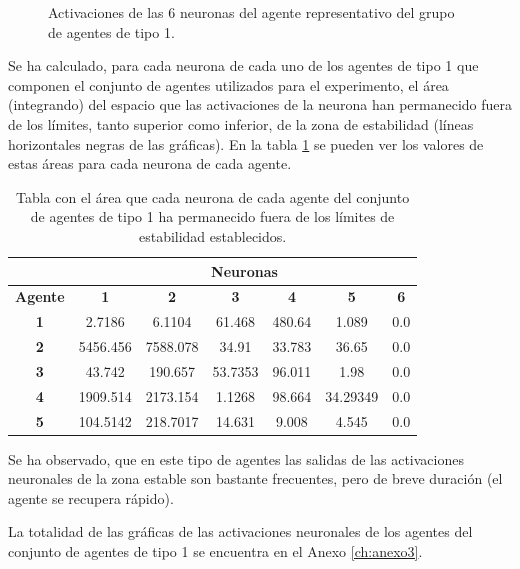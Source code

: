\begin{figure}[H]
  \caption{Activaciones de las 6 neuronas del agente representativo del grupo de agentes de tipo 1.}
  \label{fig:activ1}
\end{figure}

Se ha calculado, para cada neurona de cada uno de los agentes de tipo 1 que componen el conjunto de agentes utilizados para el experimento, el área (integrando) del espacio que las activaciones de la neurona han permanecido fuera de los límites, tanto superior como inferior, de la zona de estabilidad (líneas horizontales negras de las gráficas). En la tabla \ref{table:tActivaciones1} se pueden ver
los valores de estas áreas para cada neurona de cada agente.

\begin{table}[H]
\centering
\begin{tabular}{c|cccccc}
\multicolumn{1}{l|}{}                & \multicolumn{6}{c}{\textbf{Neuronas}}                                       \\ \hline
\multicolumn{1}{l|}{\textbf{Agente}} & \textbf{1} & \textbf{2} & \textbf{3} & \textbf{4} & \textbf{5} & \textbf{6} \\ \hline
\textbf{1}                           & 2.7186     & 6.1104     & 61.468     & 480.64     & 1.089      & 0.0        \\
\textbf{2}                           & 5456.456   & 7588.078   & 34.91      & 33.783     & 36.65      & 0.0        \\
\textbf{3}                           & 43.742     & 190.657    & 53.7353    & 96.011     & 1.98       & 0.0        \\
\textbf{4}                           & 1909.514   & 2173.154   & 1.1268     & 98.664     & 34.29349   & 0.0        \\
\textbf{5}                           & 104.5142   & 218.7017   & 14.631     & 9.008      & 4.545      & 0.0
\end{tabular}
\caption{Tabla con el área que cada neurona de cada agente del conjunto de agentes de tipo 1 ha permanecido fuera de los límites de estabilidad establecidos.}
\label{table:tActivaciones1}
\end{table}

Se ha observado, que en este tipo de agentes las salidas de las activaciones neuronales de la zona estable son bastante frecuentes, pero de breve duración (el agente se recupera rápido).

La totalidad de las gráficas de las activaciones neuronales de los agentes del conjunto de agentes de tipo 1 se encuentra en el Anexo \ref{ch:anexo3}.

